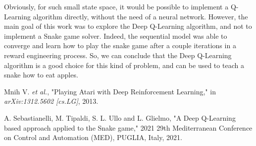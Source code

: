 \documentclass[conference]{IEEEtran}
\begin{document}
Obviously, for such small state space, it would be possible to implement a Q-Learning algorithm directly, without the need of a neural network. However, the main goal of this work was to explore the Deep Q-Learning algorithm, and not to implement a Snake game solver. Indeed, the sequential model was able to converge and learn how to play the snake game after a couple iterations in a reward engineering process. So, we can conclude that the Deep Q-Learning algorithm is a good choice for this kind of problem, and can be used to teach a snake how to eat apples.

\begin{thebibliography}{99}
    Mnih V. \textit{et al.}, "Playing Atari with Deep Reinforcement Learning," in \textit{arXiv:1312.5602 [cs.LG]}, 2013.

    A. Sebastianelli, M. Tipaldi, S. L. Ullo and L. Glielmo, "A Deep Q-Learning based approach applied to the Snake game," 2021 29th Mediterranean Conference on Control and Automation (MED), PUGLIA, Italy, 2021.

\end{thebibliography}
\end{document}
